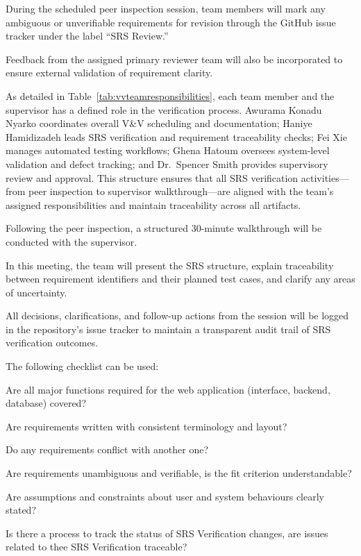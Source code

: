 \documentclass[12pt, titlepage]{article}
\begin{document}
During the scheduled peer inspection session, team members will mark any
ambiguous or unverifiable requirements for revision through the GitHub issue
tracker under the label ``SRS Review.''

Feedback from the assigned primary reviewer team will also be incorporated to
ensure external validation of requirement clarity.

As detailed in Table~\ref{tab:vvteamresponsibilities}, each team member and the
supervisor has a defined role in the verification process. Awurama Konadu Nyarko
coordinates overall V\&V scheduling and documentation; Haniye Hamidizadeh leads
SRS verification and requirement traceability checks; Fei Xie manages automated
testing workflows; Ghena Hatoum oversees system-level validation and defect
tracking; and Dr.~Spencer Smith provides supervisory review and approval. This
structure ensures that all SRS verification activities—from peer inspection to
supervisor walkthrough—are aligned with the team’s assigned responsibilities and
maintain traceability across all artifacts.

Following the peer inspection, a structured 30-minute walkthrough will be
conducted with the supervisor.

In this meeting, the team will present the SRS structure, explain traceability
between requirement identifiers and their planned test cases, and clarify any
areas of uncertainty.

All decisions, clarifications, and follow-up actions from the session will be
logged in the repository’s issue tracker to maintain a transparent audit trail
of SRS verification outcomes.

The following checklist can be used:
\begin{todolist}
  \item Are all major functions required for the web application (interface, backend, database) covered?
  \item Are requirements written with consistent terminology and layout?
  \item Do any requirements conflict with another one?
  \item Are requirements unambiguous and verifiable, is the fit criterion understandable?
  \item Are assumptions and constraints about user and system behaviours clearly stated?
  \item Is there a process to track the status of SRS Verification changes, are issues related to thee SRS Verification traceable?
\end{todolist}
\end{document}
